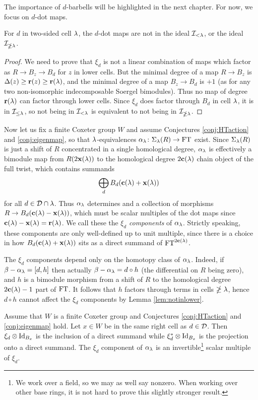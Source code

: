 The importance of $d$-barbells will be highlighted in the next chapter. For now, we focus on $d$-dot maps.

\begin{lemma} \label{lem:notinlower} For $d$ in two-sided cell $\lambda$, the $d$-dot maps are not in the ideal ${\mathcal{I}}_{< \lambda}$, or the ideal ${\mathcal{I}}_{\ngeq \lambda}$. \end{lemma}

\begin{proof} We need to prove that $\xi_d$ is not a linear combination of maps which factor as $R \to B_z \to B_d$ for $z$ in lower cells. But the minimal degree of a map $R \to B_z$ is
$\Delta(z) \ge \mathbf{r}(z) \ge \mathbf{r}(\lambda)$, and the minimal degree of a map $B_z \to B_d$ is $+1$ (as for any two non-isomorphic indecomposable Soergel bimodules). Thus no map of degree $\mathbf{r}(\lambda)$
can factor through lower cells. Since $\xi_d$ does factor through $B_d$ in cell $\lambda$, it is in ${\mathcal{I}}_{\le \lambda}$, so not being in ${\mathcal{I}}_{< \lambda}$ is equivalent to not being in ${\mathcal{I}}_{\ngeq
\lambda}$. \end{proof}

Now let us fix a finite Coxeter group $W$ and assume Conjectures \ref{conj:HTaction} and \ref{conj:eigenmap}, so that $\lambda$-equivalences $\alpha_\lambda \colon \Sigma_\lambda (R)\rightarrow \operatorname{FT}$ exist. Since $\Sigma_\lambda(R)$ is just a shift of $R$ concentrated in a single homological degree, $\alpha_\lambda$ is effectively a bimodule map from $R(2\mathbf{x}(\lambda))$ to the homological degree $2\mathbf{c}(\lambda)$ chain object of the full twist, which contains summands \[ \bigoplus_d B_d(\mathbf{c}(\lambda) + \mathbf{x}(\lambda)) \] for all $d \in {\mathcal{D}} \cap \lambda$. Thus $\alpha_\lambda$ determines and a collection of morphisms $R\rightarrow B_d(\mathbf{c}(\lambda) - \mathbf{x}(\lambda))$, which must be scalar multiples of the dot maps since $\mathbf{c}(\lambda)-\mathbf{x}(\lambda)=\mathbf{r}(\lambda)$.  We call these the \emph{$\xi_d$ components} of $\alpha_\lambda$.  Strictly speaking, these components are only well-defined up to unit multiple, since there is a choice in how $B_d(\mathbf{c}(\lambda) + \mathbf{x}(\lambda))$ sits as a direct summand of $\operatorname{FT}^{2\mathbf{c}(\lambda)}$.

The $\xi_d$ components depend only on the homotopy class of $\alpha_\lambda$.  Indeed, if $\beta-\alpha_\lambda = [d,h]$ then actually $\beta-\alpha_\lambda = d\circ h$ (the differential on $R$ being zero), and $h$ is a bimodule morphism from a shift of $R$ to the homological degree $2\mathbf{c}(\lambda)-1$ part of $\operatorname{FT}$.  It follows that $h$ factors through terms in cells $\ngeq \lambda$, hence $d\circ h$ cannot affect the $\xi_d$ components by Lemma \ref{lem:notinlower}.

\begin{proposition}\label{prop:dotsFromEigenmaps}
Assume that $W$ is a finite Coxeter group and Conjectures \ref{conj:HTaction} and \ref{conj:eigenmap} hold. Let $x \in W$ be in the same right cell as $d \in {\mathcal{D}}$. Then $\xi_d\otimes \operatorname{Id}_{B_x}$ is the inclusion of a direct summand while $\xi_d^\ast\otimes \operatorname{Id}_{B_x}$ is the projection onto a direct summand. The $\xi_d$ component of $\alpha_\lambda$ is an invertible\footnote{We work over a field, so we may as well say nonzero. When working over other base rings, it is not hard to prove this slightly stronger result.} scalar multiple of $\xi_d$.
\end{proposition}

